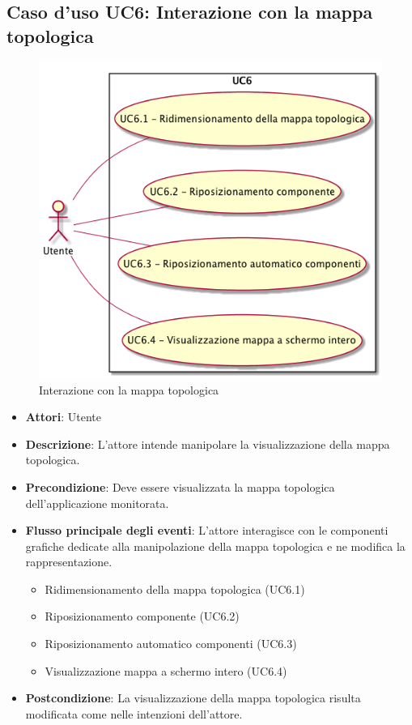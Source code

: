 \subsection{Caso d'uso UC6: Interazione con la mappa topologica}
\begin{figure} [H]
\centering
\includegraphics[scale=0.45]{./UC/UC6.png}
\caption{Interazione con la mappa topologica}\label{}
\end{figure}
\begin{itemize}
\item \textbf{Attori}: Utente
\item \textbf{Descrizione}: L'attore intende manipolare la visualizzazione della mappa topologica.
\item \textbf{Precondizione}: Deve essere visualizzata la mappa topologica dell'applicazione monitorata.
\item \textbf{Flusso principale degli eventi}: L'attore interagisce con le componenti grafiche dedicate alla manipolazione della mappa topologica e ne modifica la rappresentazione.
\begin{itemize}
\item Ridimensionamento della mappa topologica (UC6.1)
\item Riposizionamento componente (UC6.2)
\item Riposizionamento automatico componenti (UC6.3)
\item Visualizzazione mappa a schermo intero (UC6.4)
\end{itemize}
\item \textbf{Postcondizione}: La visualizzazione della mappa topologica risulta modificata come nelle intenzioni dell'attore.
\end{itemize}
